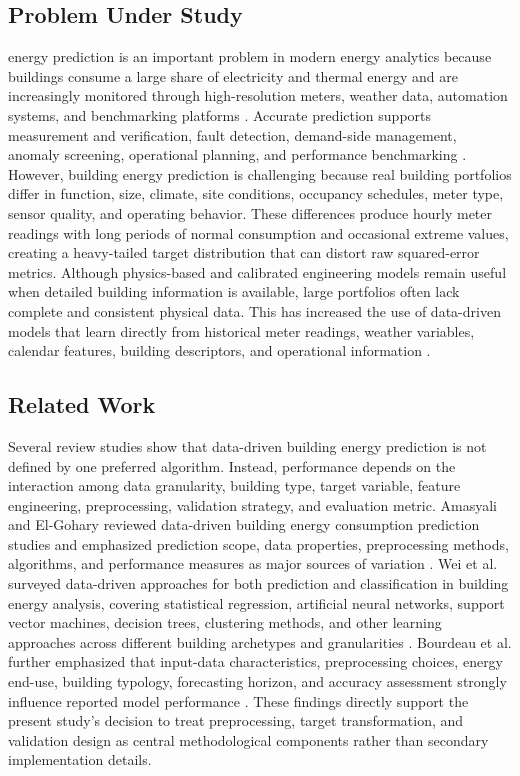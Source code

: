 \documentclass[conference]{IEEEtran}
\begin{document}
\subsection{Problem Under Study}
 energy prediction is an important problem in modern energy analytics because buildings consume a large share of electricity and thermal energy and are increasingly monitored through high-resolution meters, weather data, automation systems, and benchmarking platforms \cite{oluajayi2023datadriven,chen2025review}. Accurate prediction supports measurement and verification, fault detection, demand-side management, anomaly screening, operational planning, and performance benchmarking \cite{yesilyurt2024datadriven,mascali2023anomaly}. However, building energy prediction is challenging because real building portfolios differ in function, size, climate, site conditions, occupancy schedules, meter type, sensor quality, and operating behavior. These differences produce hourly meter readings with long periods of normal consumption and occasional extreme values, creating a heavy-tailed target distribution that can distort raw squared-error metrics. Although physics-based and calibrated engineering models remain useful when detailed building information is available, large portfolios often lack complete and consistent physical data. This has increased the use of data-driven models that learn directly from historical meter readings, weather variables, calendar features, building descriptors, and operational information \cite{chen2025review,yesilyurt2024datadriven}.

\subsection{Related Work}
Several review studies show that data-driven building energy prediction is not defined by one preferred algorithm. Instead, performance depends on the interaction among data granularity, building type, target variable, feature engineering, preprocessing, validation strategy, and evaluation metric. Amasyali and El-Gohary reviewed data-driven building energy consumption prediction studies and emphasized prediction scope, data properties, preprocessing methods, algorithms, and performance measures as major sources of variation \cite{amasyali2018review}. Wei et al. surveyed data-driven approaches for both prediction and classification in building energy analysis, covering statistical regression, artificial neural networks, support vector machines, decision trees, clustering methods, and other learning approaches across different building archetypes and granularities \cite{wei2018review}. Bourdeau et al. further emphasized that input-data characteristics, preprocessing choices, energy end-use, building typology, forecasting horizon, and accuracy assessment strongly influence reported model performance \cite{bourdeau2019review}. These findings directly support the present study's decision to treat preprocessing, target transformation, and validation design as central methodological components rather than secondary implementation details.
\end{document}
